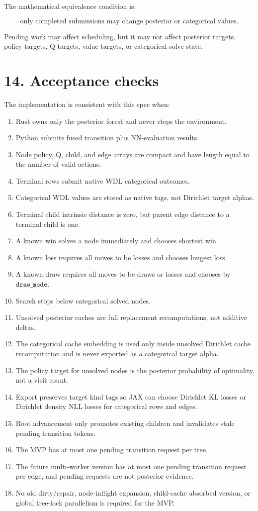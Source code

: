 \documentclass[11pt]{article}
\begin{document}
The mathematical equivalence condition is:

\[
\text{only completed submissions may change posterior or categorical values.}
\]

Pending work may affect scheduling, but it may not affect posterior targets,
policy targets, Q targets, value targets, or categorical solve state.

\section*{14. Acceptance checks}

The implementation is consistent with this spec when:

\begin{enumerate}[leftmargin=2em]
  \item Rust owns only the posterior forest and never steps the environment.
  \item Python submits fused transition plus NN-evaluation results.
  \item Node policy, Q, child, and edge arrays are compact and have length equal
  to the number of valid actions.
  \item Terminal rows submit native WDL categorical outcomes.
  \item Categorical WDL values are stored as native tags, not Dirichlet target
  alphas.
  \item Terminal child intrinsic distance is zero, but parent edge distance to a
  terminal child is one.
  \item A known win solves a node immediately and chooses shortest win.
  \item A known loss requires all moves to be losses and chooses longest loss.
  \item A known draw requires all moves to be draws or losses and chooses by
  \(\texttt{draw\_mode}\).
  \item Search stops below categorical solved nodes.
  \item Unsolved posterior caches are full replacement recomputations, not
  additive deltas.
  \item The categorical cache embedding is used only inside unsolved Dirichlet
  cache recomputation and is never exported as a categorical target alpha.
  \item The policy target for unsolved nodes is the posterior probability of
  optimality, not a visit count.
  \item Export preserves target kind tags so JAX can choose Dirichlet KL losses
  or Dirichlet density NLL losses for categorical rows and edges.
  \item Root advancement only promotes existing children and invalidates stale
  pending transition tokens.
  \item The MVP has at most one pending transition request per tree.
  \item The future multi-worker version has at most one pending transition
  request per edge, and pending requests are not posterior evidence.
  \item No old dirty/repair, node-inflight expansion, child-cache absorbed
  version, or global tree-lock parallelism is required for the MVP.
\end{enumerate}
\end{document}

